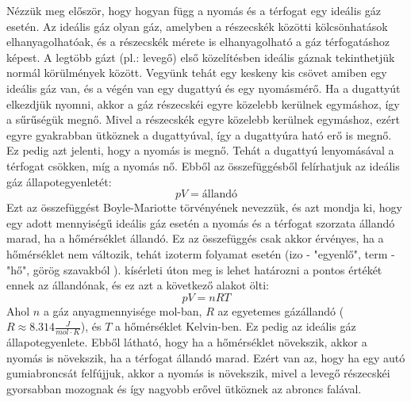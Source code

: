 \documentclass[../main.tex]{subfiles}
\begin{document}
Nézzük meg először, hogy hogyan függ a nyomás és a térfogat egy ideális gáz esetén. Az ideális gáz olyan gáz, amelyben a részecskék közötti kölcsönhatások elhanyagolhatóak,
és a részecskék mérete is elhanyagolható a gáz térfogatáshoz képest. A legtöbb gázt (pl.: levegő) első közelítésben ideális gáznak tekinthetjük normál körülmények között.
Vegyünk tehát egy keskeny kis csövet amiben egy ideális gáz van, és a végén van egy dugattyú és egy nyomásmérő. Ha a dugattyút elkezdjük nyomni, akkor a gáz részecskéi egyre közelebb kerülnek egymáshoz,
így a sűrűségük megnő. Mivel a részecskék egyre közelebb kerülnek egymáshoz, ezért egyre gyakrabban ütköznek a dugattyúval, így a dugattyúra ható erő is megnő. Ez pedig azt jelenti, hogy a nyomás is megnő.
Tehát a dugattyú lenyomásával a térfogat csökken, míg a nyomás nő. Ebből az összefüggésből felírhatjuk az ideális gáz állapotegyenletét:    
\begin{equation}
    pV = \text{állandó}
\end{equation}
Ezt az összefüggést Boyle-Mariotte törvényének nevezzük, és azt mondja ki, hogy egy adott mennyiségű ideális gáz esetén a nyomás és a térfogat szorzata állandó marad,
ha a hőmérséklet állandó. Ez az összefüggés csak akkor érvényes, ha a hőmérséklet nem változik, tehát izoterm folyamat esetén (izo - "egyenlő", term - "hő", görög szavakból ).
kísérleti úton meg is lehet határozni a pontos értékét ennek az állandónak, és ez azt a következő alakot ölti:
\begin{equation}
    pV = nRT
\end{equation}
Ahol $n$ a gáz anyagmennyisége mol-ban, $R$ az egyetemes gázállandó ($R \approx 8.314 \frac{J}{mol \cdot K}$), és $T$ a hőmérséklet Kelvin-ben. Ez pedig az ideális gáz állapotegyenlete.
Ebből látható, hogy ha a hőmérséklet növekszik, akkor a nyomás is növekszik, ha a térfogat állandó marad. Ezért van az, hogy ha egy autó gumiabroncsát felfújjuk, akkor a nyomás is növekszik,
mivel a levegő részecskéi gyorsabban mozognak és így nagyobb erővel ütköznek az abroncs falával.
\end{document}
